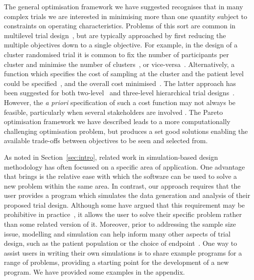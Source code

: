 \documentclass[]{sagej}
\begin{document}
The general optimisation framework we have suggested recognises that in many complex trials we are interested in minimising more than one quantity subject to constraints on operating characteristics. Problems of this sort are common in multilevel trial design~\cite{Hemming2017}, but are typically approached by first reducing the multiple objectives down to a single objective. For example, in the design of a cluster randomised trial it is common to fix the number of participants per cluster and minimise the number of clusters~\cite{Donner2000}, or vice-versa~\cite{Hemming2011, Eldridge2015}. Alternatively, a function which specifies the cost of sampling at the cluster and the patient level could be specified~\cite[p. 175]{Hox2002}, and the overall cost minimised~\cite{Snijders1993}. The latter approach has been suggested for both two-level~\cite{Raudenbush2000} and three-level hierarchical trial designs~\cite{Breukelen2012, Teerenstra2008}. However, the \emph{a priori} specification of such a cost function may not always be feasible, particularly when several stakeholders are involved \cite{Joseph1997a}. The Pareto optimisation framework we have described leads to a more computationally challenging optimisation problem, but produces a set good solutions enabling the available trade-offs between objectives to be seen and selected from. 

As noted in Section~\ref{sec:intro}, related work in simulation-based design methodology has often focussed on a specific area of application. One advantage that brings is the relative ease with which the software can be used to solve a new problem within the same area. In contrast, our approach requires that the user provides a program which simulates the data generation and analysis of their proposed trial design. Although some have argued that this requirement may be prohibitive in practice~\cite{Kontopantelis2016}, it allows the user to solve their specific problem rather than some related version of it. Moreover, prior to addressing the sample size issue, modelling and simulation can help inform many other aspects of trial design, such as the patient population or the choice of endpoint~\cite{Smith2010}. One way to assist users in writing their own simulations is to share example programs for a range of problems, providing a starting point for the development of a new program. We have provided some examples in the appendix.

\end{document}
